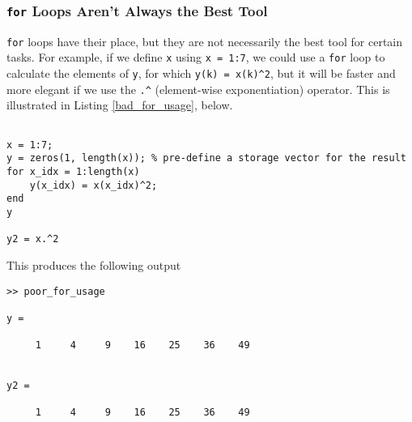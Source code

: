 \subsubsection{\texttt{for} Loops Aren't Always the Best Tool}
\texttt{for} loops have their place, but they are not necessarily the best tool for certain tasks. For example, if we define \texttt{x} using \verb!x = 1:7!, we could use a \texttt{for} loop to calculate the elements of \texttt{y}, for which \verb!y(k) = x(k)^2!, but it will be faster and more elegant if we use the \verb!.^! (element-wise exponentiation) operator. This is illustrated in Listing \ref{bad_for_usage}, below.
\begin{lstlisting}[style=Matlab-editor, label={bad_for_usage}, caption={Element-wise operations may be faster and more elegant than using a \texttt{for} loop. Here, we use a \texttt{for} loop to square every element of \texttt{x} and store the result in \texttt{y} (lines 5-7). Alternately, we use an element-wise exponentiation to square each element of \texttt{x} and save the results in \texttt{y2}. The element-wise exponentiation is faster, more efficient, clearer, and more concise than the \texttt{for}-loop approach.}]
% poor_for_usage.m

x = 1:7;
y = zeros(1, length(x)); % pre-define a storage vector for the result
for x_idx = 1:length(x)
    y(x_idx) = x(x_idx)^2;
end
y

y2 = x.^2
\end{lstlisting}
This produces the following output
\begin{lstlisting}[style=Matlab-editor, label={bad_for_usage_output}, caption={The output of Listing \ref{bad_for_usage} shows a case where an element-wise operation yields the same result as a \texttt{for}-loop execution.}]
>> poor_for_usage

y =

     1     4     9    16    25    36    49


y2 =

     1     4     9    16    25    36    49
\end{lstlisting}

